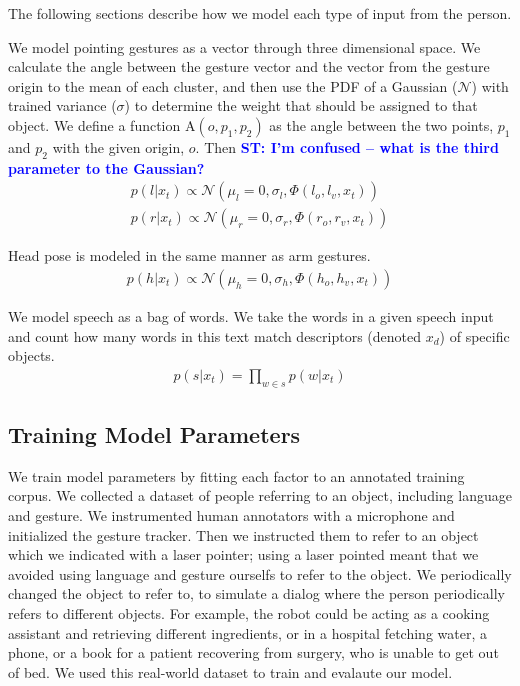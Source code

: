 \documentclass[letterpaper, 10 pt, conference]{ieeeconf}
\newcommand{\stnote}[1]{\textcolor{Blue}{\textbf{ST: #1}}}
\begin{document}
\noindent The following sections describe how we model each type of
input from the person.

  We model pointing gestures as a vector
through three dimensional space. We calculate the angle between the
gesture vector and the vector from the gesture origin to the mean of
each cluster, and then use the PDF of a Gaussian ($\mathcal{N}$) with
trained variance ($\sigma$) to determine the weight that should be
assigned to that object. We define a function $\mbox{A}(o, p_1, p_2)$ as the
angle between the two points, $p_1$ and $p_2$ with the given origin,
$o$.  Then 
\stnote{I'm confused -- what is the third parameter to the Gaussian?}
\begin{align}
p(l | x_t) \propto \mathcal{N}(\mu_l=0, \sigma_l,\Phi(l_o, l_v, x_t))\\
p(r | x_t) \propto \mathcal{N}(\mu_r=0, \sigma_r,\Phi(r_o, r_v, x_t))
\end{align}

Head pose is modeled in the same manner as arm gestures.
\begin{align}
p(h | x_t) \propto \mathcal{N}(\mu_h=0, \sigma_h,\Phi(h_o, h_v, x_t))
\end{align}


  We model speech as a bag of words. We
take the words in a given speech input and count how many words in
this text match descriptors (denoted $x_d$) of specific objects.
\begin{align}
p(s |x_t) = \displaystyle \prod_{w \in s} p(w | x_t)
\end{align}

\subsection{Training Model Parameters}

We train model parameters by fitting each factor to an annotated
training corpus.  We collected a dataset of people referring to an
object, including language and gesture.  We instrumented human
annotators with a microphone and initialized the gesture tracker.
Then we instructed them to refer to an object which we indicated with
a laser pointer; using a laser pointed meant that we avoided using
language and gesture ourselfs to refer to the object.  We periodically
changed the object to refer to, to simulate a dialog where the person
periodically refers to different objects.  For example, the robot
could be acting as a cooking assistant and retrieving different
ingredients, or in a hospital fetching water, a phone, or a book for a
patient recovering from surgery, who is unable to get out of bed.  We
used this real-world dataset to train and evalaute our model.
\end{document}
